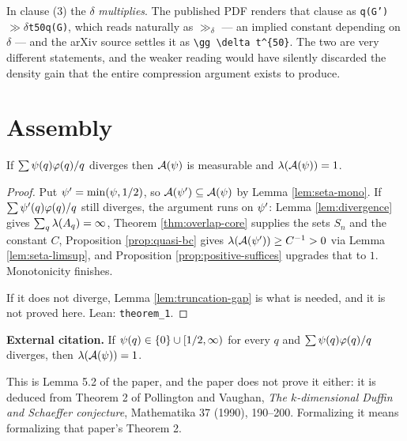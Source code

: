 \begin{remark}
  In clause (3) the $\delta$ \emph{multiplies}. The published PDF renders that clause as
  \texttt{q(G')}$\gg\delta$\texttt{t50q(G)}, which reads naturally as $\gg_\delta$ --- an
  implied constant depending on $\delta$ --- and the arXiv source settles it as
  \verb|\gg \delta t^{50}|. The two are very different statements, and the weaker reading
  would have silently discarded the density gain that the entire compression argument
  exists to produce.
\end{remark}

\chapter{Assembly}
\label{chap:main}

\begin{theorem}
  \label{thm:one}
  \notready
  If $\sum \psi(q)\varphi(q)/q$ diverges then $\mathcal{A}(\psi)$ is measurable and
  $\lambda(\mathcal{A}(\psi)) = 1$.
\end{theorem}

\begin{proof}
  Put $\psi' = \min(\psi, 1/2)$, so $\mathcal{A}(\psi') \subseteq \mathcal{A}(\psi)$ by Lemma
  \ref{lem:seta-mono}. If $\sum \psi'(q)\varphi(q)/q$ still diverges, the argument runs on
  $\psi'$: Lemma \ref{lem:divergence} gives $\sum_q \lambda(A_q) = \infty$, Theorem
  \ref{thm:overlap-core} supplies the sets $S_n$ and the constant $C$, Proposition
  \ref{prop:quasi-bc} gives $\lambda(\mathcal{A}(\psi')) \geq C^{-1} > 0$ via Lemma
  \ref{lem:seta-limsup}, and Proposition \ref{prop:positive-suffices} upgrades that to
  $1$. Monotonicity finishes.

  If it does not diverge, Lemma \ref{lem:truncation-gap} is what is needed, and it is not
  proved here. Lean: \texttt{theorem\_1}.
\end{proof}

\begin{lemma}
  \label{lem:large-values}
  \notready
  \textbf{External citation.} If $\psi(q) \in \{0\} \cup [1/2,\infty)$ for every $q$ and
  $\sum \psi(q)\varphi(q)/q$ diverges, then $\lambda(\mathcal{A}(\psi)) = 1$.

  This is Lemma 5.2 of the paper, and the paper does not prove it either: it is deduced
  from Theorem 2 of Pollington and Vaughan, \emph{The $k$-dimensional Duffin and Schaeffer
  conjecture}, Mathematika 37 (1990), 190--200. Formalizing it means formalizing that
  paper's Theorem 2.
\end{lemma}

